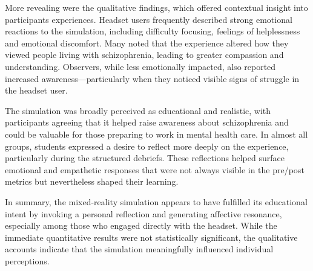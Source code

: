 More revealing were the qualitative findings, which offered contextual insight into participants experiences. Headset users frequently described strong emotional reactions to the simulation, including difficulty focusing, feelings of helplessness and emotional discomfort. Many noted that the experience altered how they viewed people living with schizophrenia, leading to greater compassion and understanding. Observers, while less emotionally impacted, also reported increased awareness—particularly when they noticed visible signs of struggle in the headset user.

The simulation was broadly perceived as educational and realistic, with participants agreeing that it helped raise awareness about schizophrenia and could be valuable for those preparing to work in mental health care. In almost all groups, students expressed a desire to reflect more deeply on the experience, particularly during the structured debriefs. These reflections helped surface emotional and empathetic responses that were not always visible in the pre/post metrics but nevertheless shaped their learning.

In summary, the mixed-reality simulation appears to have fulfilled its educational intent by invoking a  personal reflection and generating affective resonance, especially among those who engaged directly with the headset. While the immediate quantitative results were not statistically significant, the qualitative accounts indicate that the simulation meaningfully influenced individual perceptions.
